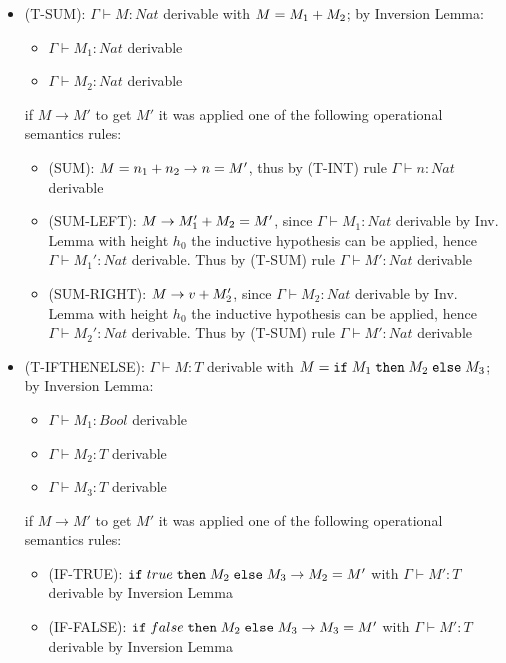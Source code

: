 \begin{itemize}
	\item (T-SUM): $\Gamma \vdash M: Nat$ derivable with $M = M_1+M_2$;
	      by Inversion Lemma:
	      \begin{itemize}
		      \item $\Gamma \vdash M_1: Nat$ derivable
		      \item $\Gamma \vdash M_2: Nat$ derivable
	      \end{itemize}
	      if $M \to M'$ to get $M'$ it was applied one of the following operational semantics rules:
	      \begin{itemize}
		      \item (SUM): $M = n_1+n_2 \to n = M'$, thus by (T-INT) rule
		            $\Gamma \vdash n: Nat$ derivable
		      \item (SUM-LEFT): $M \to M_1'+M_2 = M'$,
		            since $\Gamma \vdash M_1: Nat$ derivable
		            by Inv. Lemma with height $h_0$ the inductive hypothesis can be applied, hence
		            $\Gamma \vdash M_1': Nat$ derivable. Thus by (T-SUM) rule $\Gamma \vdash M': Nat$
		            derivable
		      \item (SUM-RIGHT): $M \to v+M_2'$, since $\Gamma \vdash M_2: Nat$ derivable
		            by Inv. Lemma with height $h_0$ the inductive hypothesis can be applied, hence
		            $\Gamma \vdash M_2': Nat$ derivable. Thus by (T-SUM) rule $\Gamma \vdash M': Nat$
		            derivable
	      \end{itemize}
	\item (T-IFTHENELSE): $\Gamma \vdash M: T$ derivable with $M = \texttt{if}\;M_1\;\texttt{then}\;M_2\;\texttt{else}\;M_3$;
	      by Inversion Lemma:
	      \begin{itemize}
		      \item $\Gamma \vdash M_1: Bool$ derivable
		      \item $\Gamma \vdash M_2: T$ derivable
		      \item $\Gamma \vdash M_3: T$ derivable
	      \end{itemize}
	      if $M \to M'$ to get $M'$ it was applied one of the following operational semantics rules:
	      \begin{itemize}
		      \item (IF-TRUE): $\texttt{if}\;true\;\texttt{then}\;M_2\;\texttt{else}\;M_3 \to M_2 = M'$ with $\Gamma \vdash M': T$
		            derivable by Inversion Lemma
		      \item (IF-FALSE): $\texttt{if}\;false\;\texttt{then}\;M_2\;\texttt{else}\;M_3 \to M_3 = M'$ with $\Gamma \vdash M': T$
		            derivable by Inversion Lemma

\end{itemize}
\end{itemize}
